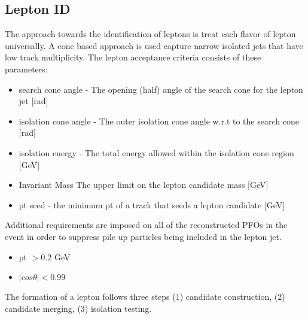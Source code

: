 \subsection{Lepton ID}
\label{subsec:Lepton_ID}
The approach towards the identification of leptons is treat each flavor of lepton universally. A cone based approach is used capture narrow isolated jets that have low track multiplicity. The lepton acceptance criteria consists of these  parameters:
\begin{itemize}
\item search cone angle - The opening (half) angle of the search cone for the lepton jet [rad]
\item isolation cone angle - The outer isolation cone angle w.r.t to the search cone [rad]
\item isolation energy - The total energy allowed within the isolation cone region [GeV]
\item Invariant Mass The upper limit on the lepton candidate mass [GeV]
\item pt seed - the minimum pt of a track that seeds a lepton candidate [GeV] 
\end{itemize}
Additional requirements are imposed on all of the reconstructed PFOs in the event in order to suppress pile up particles being included in the lepton jet.
\begin{itemize}
\item pt $> 0.2$ GeV
\item $|cos\theta| < 0.99$
\end{itemize}
The formation of a lepton follows three steps (1) candidate construction, (2) candidate merging, (3) isolation testing.
